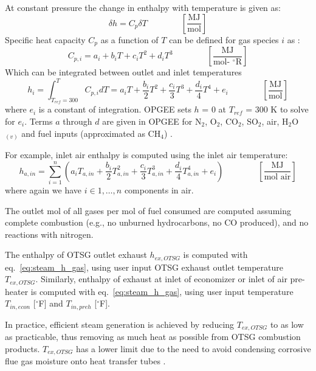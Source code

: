 \documentclass[11pt]{report}
\newcommand{\eqnunitfrac}[2]{\quad\quad \scriptstyle{\left[\frac{\text{#1}}{\text{#2}}\right]}}
\begin{document}
At constant pressure the change in enthalpy with temperature is given as:
\begin{equation}\label{eq:steam_dh}
\delta h = C_p \delta T \quad\quad\eqnunitfrac{MJ}{mol}
\end{equation}
Specific heat capacity $C_p$ as a function of $T$ can be defined for gas species $i$ as \cite[Table A-2E]{Cengel2006}:
\begin{equation}\label{eq:steam_cp}
C_{p,i}= a_i+b_iT + c_iT^2 + d_iT^3 \quad\quad\eqnunitfrac{MJ}{mol- $^\circ$R}
\end{equation}
Which can be integrated between outlet and inlet temperatures
\begin{equation}\label{eq:steam_hx}
h_i = \int_{T_{ref}=300}^{T} C_{p,i} dT = a_iT+\frac{b_i}{2}T^2 + \frac{c_i}{3}T^3 + \frac{d_i}{4}T^4 + e_i \quad\quad\eqnunitfrac{MJ}{mol}
\end{equation}
where $e_i$ is a constant of integration. OPGEE sets $h$ = 0 at $T_{ref}$ = 300 K to solve for $e_i$. Terms $a$ through $d$ are given in OPGEE for N$_2$, O$_2$, CO$_2$, SO$_2$, air, H$_2$O$_{(v)}$ and fuel inputs (approximated as CH$_4$) \cite{Cengel2006}. 

For example, inlet air enthalpy is computed using the inlet air temperature:
\begin{equation}\label{eq:steam_h_gas}
h_{a,in} = \sum_{i=1}^{n}\left( a_i T_{a,in} +\frac{b_i}{2}T_{a,in}^2 + \frac{c_i}{3}T_{a,in}^3 + \frac{d_i}{4}T_{a,in}^4 + e_i \right) \quad\quad\eqnunitfrac{MJ}{mol air}
\end{equation}
where again we have $i \in {1, \ldots, n}$ components in air.

The outlet mol of  all gases per mol of fuel consumed are computed assuming complete combustion (e.g., no unburned hydrocarbons, no CO produced), and no reactions with nitrogen. 

The enthalpy of OTSG outlet exhaust $h_{ex,OTSG}$ is computed with eq.\ \eqref{eq:steam_h_gas}, using user input OTSG exhaust outlet temperature $T_{ex,OTSG}$. Similarly, enthalpy of exhaust at inlet of economizer or inlet of air pre-heater is computed with eq.\ \eqref{eq:steam_h_gas}, using user input temperature $T_{in,econ}$ [$^\circ$F] and $T_{in,preh}$ [$^\circ$F]. 

In practice, efficient steam generation is achieved by reducing $T_{ex,OTSG}$ to as low as practicable, thus removing as much heat as possible from OTSG combustion products. $T_{ex,OTSG}$ has a lower limit due to the need to avoid condensing corrosive flue gas moisture onto heat transfer tubes \cite{Ganapathy2003}. 
\end{document}
